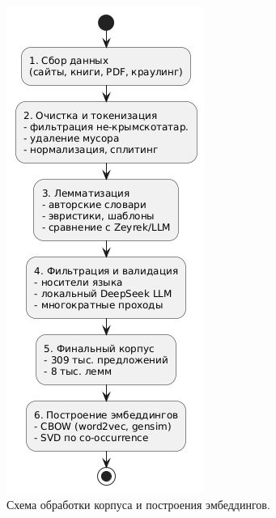 \documentclass{article}
\begin{document}
\begin{figure}[!tbh]
    \centering
    \includegraphics[width=0.85\linewidth]{pipeline.png}
    \caption{Схема обработки корпуса и построения эмбеддингов.}
    \label{fig:flowchart}
\end{figure}
\end{document}
